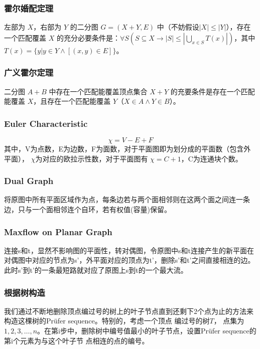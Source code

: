 \subsubsection{霍尔婚配定理}

左部为 $X$，右部为 $Y$ 的二分图 $G=(X+Y,E)$ 中（不妨假设$|X|\le|Y|$），存在一个匹配覆盖 $X$ 的充分必要条件是：$\displaystyle\forall S(S\subseteq X \to\left|S\right|\le\left|\bigcup\limits_{x\in S}T(x)\right|)$，其中 $T(x)=\{y|y\in Y\land\left[(x,y)\in E\right]\}$。

\subsubsection{广义霍尔定理}

二分图 $A+B$ 中存在一个匹配能覆盖顶点集合 $X+Y$ 的充要条件是存在一个匹配能覆盖 $X$，且存在一个匹配能覆盖 $Y$（$X\in A\land Y\in B$）。

\subsubsection{Euler Characteristic}
$$ \chi = V-E+F $$
其中，V为点数，E为边数，F为面数，对于平面图即为划分成的平面数（包含外平面），
$ \chi $为对应的欧拉示性数，对于平面图有 $ \chi = C + 1 $，C为连通块个数。

\subsubsection{Dual Graph}
将原图中所有平面区域作为点，每条边若与两个面相邻则在这两个面之间连一条边，只与一个面相邻连个自环，若有权值(容量)保留。

\subsubsection{Maxflow on Planar Graph}
连接s和t，显然不影响图的平面性，转对偶图，令原图中s和t连接产生的新平面在对偶图中对应的节点为s'，外平面对应的顶点为t'，删除s'和t'之间直接相连的边。
此时s'到t'的一条最短路就对应了原图上s到t的一个最大流。

\subsubsection{根据树构造}
我们通过不断地删除顶点编过号的树上的叶子节点直到还剩下2个点为止的方法来构造这棵树的Prüfer sequence。特别的，考虑一个顶点
编过号的树$T$， 点集为$ { 1, 2, 3, \ldots , n} $。在第i步中，删除树中编号值最小的叶子节点，设置Prüfer sequence的第i个元素为与这个叶子节
点相连的点的编号。

